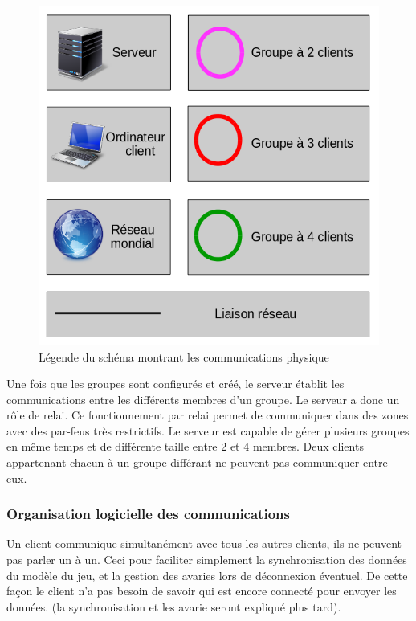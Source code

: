 \documentclass[a4paper,11pt]{report}
\begin{document}
   \begin{figure}[th]
      \begin{center}
        \includegraphics[scale=0.2]{Assets/l_r_1.png}
        \caption{Légende du schéma montrant les communications physique}
        \label{leSchémaCom}
      \end{center}
    \end{figure}
    
  
  Une fois que les groupes sont configurés et créé, le serveur établit les communications entre les différents membres d’un groupe. Le serveur a donc un rôle de relai.
Ce fonctionnement par relai permet de communiquer dans des zones avec des par-feus très restrictifs.
Le serveur est capable de gérer plusieurs groupes en même temps et de différente taille entre 2 et 4 membres. Deux clients appartenant chacun à un groupe différant ne peuvent pas communiquer entre eux.

\subsubsection{Organisation logicielle des communications}

  Un client communique simultanément avec tous les autres clients, ils ne peuvent pas parler un à un. 
Ceci pour faciliter simplement la synchronisation des données du modèle du jeu, et la gestion des avaries lors de déconnexion éventuel. De cette façon le client n’a pas besoin de savoir qui est encore connecté pour envoyer les données. (la synchronisation et les avarie seront expliqué plus tard).
  
\end{document}
